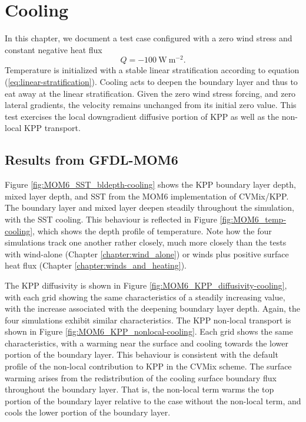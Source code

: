 \chapter{Cooling}
\label{chapter:cooling-only}

In this chapter, we document a test case configured with a zero wind
stress and constant negative heat flux
\begin{equation}
Q=-100~\mbox{W}~\mbox{m}^{-2}.
\end{equation}
Temperature is initialized with a stable linear stratification
according to equation (\ref{eq:linear-stratification}).  Cooling acts
to deepen the boundary layer and thus to eat away at the linear
stratification. Given the zero wind stress forcing, and zero lateral
gradients, the velocity remains unchanged from its initial zero value.
This test exercises the local downgradient diffusive portion of KPP as
well as the non-local KPP transport.


\section{Results from GFDL-MOM6}
\label{section:winds_and_cooling_mom6}

Figure \ref{fig:MOM6_SST_bldepth-cooling} shows the KPP boundary layer
depth, mixed layer depth, and SST from the MOM6 implementation of
CVMix/KPP.  The boundary layer and mixed layer deepen steadily
throughout the simulation, with the SST cooling.  This behaviour is
reflected in Figure \ref{fig:MOM6_temp-cooling}, which shows the depth
profile of temperature.  Note how the four simulations track one
another rather closely, much more closely than the tests with
wind-alone (Chapter \ref{chapter:wind_alone}) or winds plus positive
surface heat flux (Chapter \ref{chapter:winds_and_heating}).

The KPP diffusivity is shown in Figure
\ref{fig:MOM6_KPP_diffusivity-cooling}, with each grid showing the
same characteristics of a steadily increasing value, with the increase
associated with the deepening boundary layer depth. Again, the four
simulations exhibit similar characteristics.  The KPP non-local
transport is shown in Figure \ref{fig:MOM6_KPP_nonlocal-cooling}.
Each grid shows the same characteristics, with a warming near the
surface and cooling towards the lower portion of the boundary layer.
This behaviour is consistent with the default profile of the non-local
contribution to KPP in the CVMix scheme.  The surface warming arises
from the redistribution of the cooling surface boundary flux
throughout the boundary layer.  That is, the non-local term warms the
top portion of the boundary layer relative to the case without the
non-local term, and cools the lower portion of the boundary layer.
  

